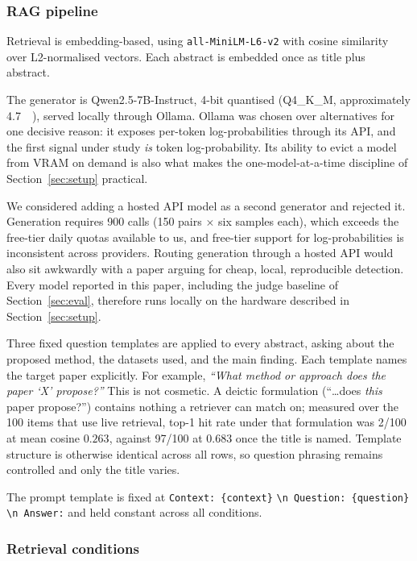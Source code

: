 \documentclass[11pt,a4paper]{article}
\begin{document}
\subsubsection{RAG pipeline}

Retrieval is embedding-based, using \texttt{all-MiniLM-L6-v2}
\cite{reimers2019sentencebert} with cosine similarity over L2-normalised
vectors. Each abstract is embedded once as title plus abstract.

The generator is Qwen2.5-7B-Instruct, 4-bit quantised (Q4\_K\_M, approximately
\SI{4.7}{\giga\byte}), served locally through Ollama. Ollama was chosen over
alternatives for one decisive reason: it exposes per-token log-probabilities
through its API, and the first signal under study \emph{is} token
log-probability. Its ability to evict a model from VRAM on demand is also what
makes the one-model-at-a-time discipline of Section~\ref{sec:setup} practical.

We considered adding a hosted API model as a second generator and rejected it.
Generation requires 900 calls (150 pairs $\times$ six samples each), which
exceeds the free-tier daily quotas available to us, and free-tier support for
log-probabilities is inconsistent across providers. Routing generation through a
hosted API would also sit awkwardly with a paper arguing for cheap, local,
reproducible detection. Every model reported in this paper, including the judge
baseline of Section~\ref{sec:eval}, therefore runs locally on the hardware
described in Section~\ref{sec:setup}.

Three fixed question templates are applied to every abstract, asking about the
proposed method, the datasets used, and the main finding. Each template names
the target paper explicitly. For example, \emph{``What method or approach does
the paper `X' propose?''} This is not cosmetic. A deictic formulation
(``\ldots does \emph{this} paper propose?'') contains nothing a retriever can
match on; measured over the 100 items that use live retrieval, top-1 hit rate
under that formulation was 2/100 at mean cosine $0.263$, against 97/100 at
$0.683$ once the title is named. Template structure is otherwise identical
across all rows, so question phrasing remains controlled and only the title
varies.

The prompt template is fixed at \texttt{Context: \{context\}}
\texttt{\textbackslash n Question: \{question\}} \texttt{\textbackslash n
Answer:} and held constant across all conditions.

\subsubsection{Retrieval conditions}
\label{sec:conditions}
\end{document}
